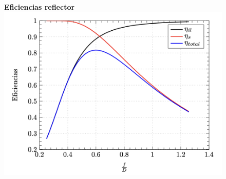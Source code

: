 \documentclass[twocolumn, 8pt]{extarticle}
\begin{document}
\begin{figure}[H]
	\centering
	\textbf{Eficiencias reflector}
	\includegraphics[width=\columnwidth]{eficiencias.png}
\end{figure}
\end{document}
